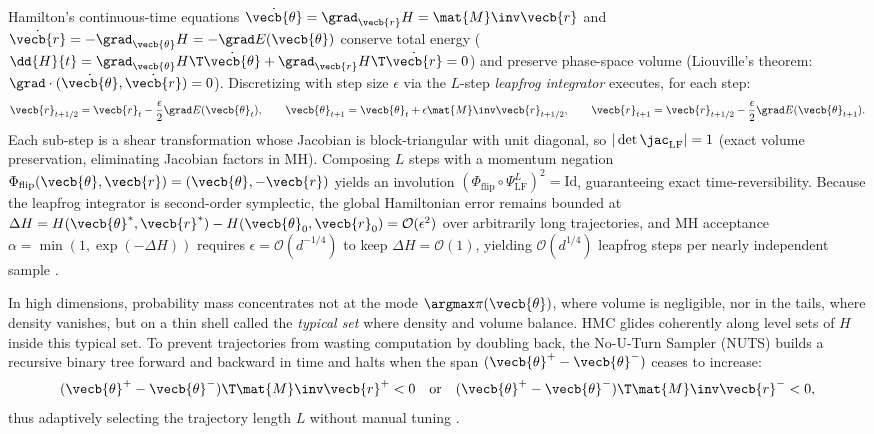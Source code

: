\documentclass[../../../../master.tex]{subfiles}
\begin{document}
\begin{coremath}
Hamilton's continuous-time equations $\dot{\vecb{\theta}} = \grad_{\vecb{r}} H = \mat{M}\inv\vecb{r}$ and $\dot{\vecb{r}} = -\grad_{\vecb{\theta}} H = -\grad E(\vecb{\theta})$ conserve total energy ($\dd{H}{t} = \grad_{\vecb{\theta}}H\T\dot{\vecb{\theta}} + \grad_{\vecb{r}}H\T\dot{\vecb{r}} = 0$) and preserve phase-space volume (Liouville's theorem: $\grad \cdot (\dot{\vecb{\theta}}, \dot{\vecb{r}}) = 0$). Discretizing with step size $\epsilon$ via the $L$-step \emph{leapfrog integrator} executes, for each step:
\begin{equation}
  \label{eq:mcmc:leapfrog}
  \vecb{r}_{t+1/2} = \vecb{r}_t - \frac{\epsilon}{2}\grad E(\vecb{\theta}_t), \qquad
  \vecb{\theta}_{t+1} = \vecb{\theta}_t + \epsilon \mat{M}\inv \vecb{r}_{t+1/2}, \qquad
  \vecb{r}_{t+1} = \vecb{r}_{t+1/2} - \frac{\epsilon}{2}\grad E(\vecb{\theta}_{t+1}).
\end{equation}
Each sub-step is a shear transformation whose Jacobian is block-triangular with unit diagonal, so $|\det \jac_{\mathrm{LF}}| = 1$ (exact volume preservation, eliminating Jacobian factors in MH). Composing $L$ steps with a momentum negation $\Phi_{\mathrm{flip}}(\vecb{\theta}, \vecb{r}) = (\vecb{\theta}, -\vecb{r})$ yields an involution $(\Phi_{\mathrm{flip}} \circ \Psi_{\mathrm{LF}}^L)^2 = \mathrm{Id}$, guaranteeing exact time-reversibility. Because the leapfrog integrator is second-order symplectic, the global Hamiltonian error remains bounded at $\Delta H = H(\vecb{\theta}^*, \vecb{r}^*) - H(\vecb{\theta}_0, \vecb{r}_0) = \mathcal{O}(\epsilon^2)$ over arbitrarily long trajectories, and MH acceptance $\alpha = \min(1, \exp(-\Delta H))$ requires $\epsilon = \mathcal{O}(d^{-1/4})$ to keep $\Delta H = \mathcal{O}(1)$, yielding $\mathcal{O}(d^{1/4})$ leapfrog steps per nearly independent sample .
\end{coremath}

\begin{intuition}
In high dimensions, probability mass concentrates not at the mode $\argmax \pi(\vecb{\theta})$, where volume is negligible, nor in the tails, where density vanishes, but on a thin shell called the \emph{typical set} where density and volume balance. HMC glides coherently along level sets of $H$ inside this typical set. To prevent trajectories from wasting computation by doubling back, the No-U-Turn Sampler (NUTS) builds a recursive binary tree forward and backward in time and halts when the span $(\vecb{\theta}^+ - \vecb{\theta}^-)$ ceases to increase:
\begin{equation}
  \label{eq:mcmc:nuts}
  (\vecb{\theta}^+ - \vecb{\theta}^-)\T \mat{M}\inv \vecb{r}^+ < 0
  \quad\text{or}\quad
  (\vecb{\theta}^+ - \vecb{\theta}^-)\T \mat{M}\inv \vecb{r}^- < 0,
\end{equation}
thus adaptively selecting the trajectory length $L$ without manual tuning .
\end{intuition}
\end{document}
